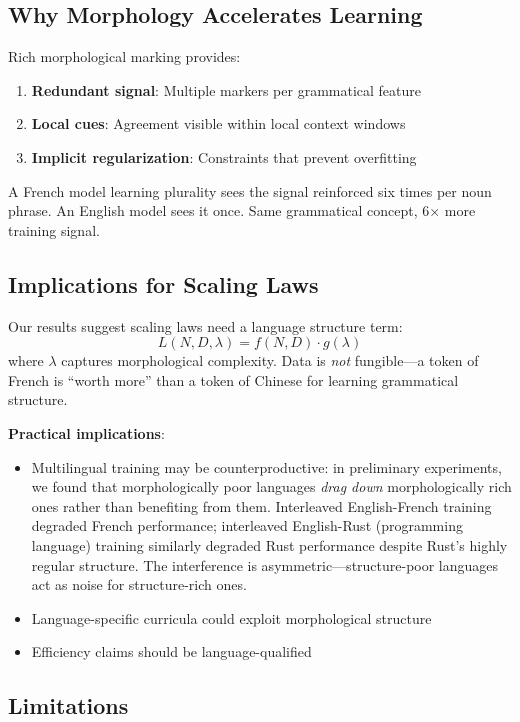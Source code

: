 \documentclass[11pt]{article}
\begin{document}
\subsection{Why Morphology Accelerates Learning}

Rich morphological marking provides:
\begin{enumerate}
    \item \textbf{Redundant signal}: Multiple markers per grammatical feature
    \item \textbf{Local cues}: Agreement visible within local context windows
    \item \textbf{Implicit regularization}: Constraints that prevent overfitting
\end{enumerate}

A French model learning plurality sees the signal reinforced six times per noun phrase. An English model sees it once. Same grammatical concept, 6× more training signal.

\subsection{Implications for Scaling Laws}

Our results suggest scaling laws need a language structure term:
\[
L(N, D, \lambda) = f(N, D) \cdot g(\lambda)
\]
where $\lambda$ captures morphological complexity. Data is \textit{not} fungible—a token of French is ``worth more'' than a token of Chinese for learning grammatical structure.

\textbf{Practical implications}:
\begin{itemize}
    \item Multilingual training may be counterproductive: in preliminary experiments, we found that morphologically poor languages \textit{drag down} morphologically rich ones rather than benefiting from them. Interleaved English-French training degraded French performance; interleaved English-Rust (programming language) training similarly degraded Rust performance despite Rust's highly regular structure. The interference is asymmetric—structure-poor languages act as noise for structure-rich ones.
    \item Language-specific curricula could exploit morphological structure
    \item Efficiency claims should be language-qualified
\end{itemize}

\subsection{Limitations}
\end{document}
